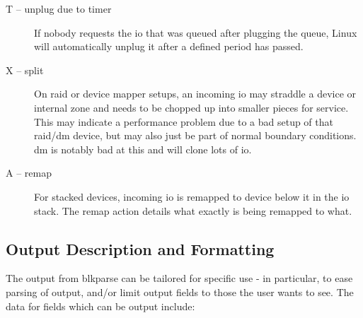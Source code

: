 \documentclass{article}
\begin{document}
\begin{description}
  \item[T -- unplug due to timer] If nobody requests the io that was queued
  after plugging the queue, Linux will automatically unplug it after a
  defined period has passed.

  \item[X -- split] On raid or device mapper setups, an incoming io may
  straddle a device or internal zone and needs to be chopped up into
  smaller pieces for service. This may indicate a performance problem due
  to a bad setup of that raid/dm device, but may also just be part of
  normal boundary conditions. dm is notably bad at this and will clone
  lots of io.

  \item[A -- remap] For stacked devices, incoming io is remapped to device
  below it in the io stack. The remap action details what exactly is
  being remapped to what.

\end{description}

\subsection{\label{sec:blkparse-format}Output Description and Formatting}

The output from blkparse can be tailored for specific use - in particular,
to ease parsing of output, and/or limit output fields to those the user
wants to see. The data for fields which can be output include:
\end{document}
